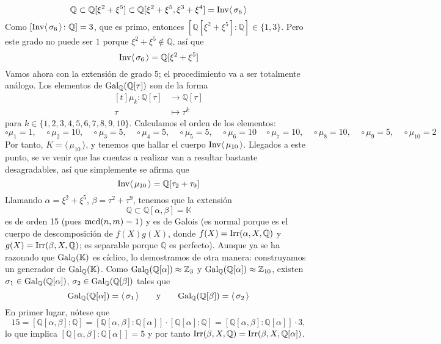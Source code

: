 \documentclass[11pt]{report}
\makeatletter
\renewenvironment{proof}[1][\proofname]{\par
  \pushQED{\qed}%
  \normalfont \topsep\z@skip %
  \trivlist
  \item[\hskip\labelsep
        \itshape
    #1\@addpunct{.}]\ignorespaces
}{%
  \popQED\endtrivlist\@endpefalse
}
\newcommand{\Z}{\mathbb Z}
\newcommand{\Q}{\mathbb Q}
\newcommand{\K}{\mathbb K}
\makeatother
\begin{document}
\begin{proof}
\[\Q \subset \Q[\xi^2+\xi^5] \subset \Q[\xi^2+\xi^5,\xi^3+\xi^4] = \textup{Inv}\langle \, \sigma_6 \, \rangle\]
Como $[ \textup{Inv}\langle \, \sigma_6 \, \rangle \colon \Q] = 3$, que es primo, entonces $[\Q[\xi^2+\xi^5] \colon \Q] \in \{1,3\}$. Pero este grado no puede ser $1$ porque $\xi^2 +\xi^5 \not\in \Q$, así que
\[\textup{Inv}\langle \, \sigma_6 \, \rangle = \Q[\xi^2+\xi^5]\]
Vamos ahora con la extensión de grado 5; el procedimiento va a ser totalmente análogo. Los elementos de $\textup{Gal}_\Q(\Q[\tau])$ son de la forma
\[\begin{aligned}[t]
    \mu_k \colon \Q[\tau] &\longrightarrow \Q[\tau] \\
    \tau &\longmapsto \tau^k
\end{aligned}\]
para $k \in \{1,2,3,4,5,6,7,8,9,10\}$. Calculamos el orden de los elementos:
\[\circ \mu_1 = 1, \quad \circ \mu_2 = 10, \quad \circ \mu_3 = 5, \quad \circ \mu_4 = 5, \quad \circ \mu_5 = 5, \quad \circ \mu_6 = 10 \quad \circ \mu_7 =  10,\quad \circ \mu_8 =  10,\quad \circ \mu_9 = 5, \quad \circ \mu_{10} = 2\]
Por tanto, $K = \langle \, \mu_{10}\, \rangle$, y tenemos que hallar el cuerpo $\textup{Inv}\langle \, \mu_{10} \, \rangle$. Llegados a este punto, se ve venir que las cuentas a realizar van a resultar bastante desagradables, así que simplemente se afirma que
\[\textup{Inv}\langle \, \mu_{10} \, \rangle = \Q[\tau_2+\tau_9]\]
Llamando $\alpha = \xi^2+\xi^5$, $\beta = \tau^2+\tau^9$, tenemos que la extensión \[\Q \subset \Q[\alpha,\beta]= \K\] es de orden 15 (pues $\textup{mcd}(n,m)=1$) y es de Galois (es normal porque es el cuerpo de descomposición de $f(X)g(X)$, donde $f(X)=\textup{Irr}(\alpha,X,\Q)$ y $g(X)=\textup{Irr}(\beta,X,\Q)$; es separable porque $\Q$ es perfecto). Aunque ya se ha razonado que $\textup{Gal}_\Q(\K)$ es cíclico, lo demostramos de otra manera: construyamos un generador de $\textup{Gal}_\Q(\K)$. Como $\textup{Gal}_\Q(\Q[\alpha]) \approx \Z_3$ y $\textup{Gal}_\Q(\Q[\alpha]) \approx \Z_{10}$, existen $\sigma_1 \in \textup{Gal}_\Q(\Q[\alpha])$, $\sigma_2 \in \textup{Gal}_\Q(\Q[\beta])$ tales que
\[ \textup{Gal}_\Q(\Q[\alpha])=\langle \, \sigma_1 \, \rangle \qquad \textup{y} \qquad  \textup{Gal}_\Q(\Q[\beta]) = \langle \, \sigma_2 \, \rangle\]
En primer lugar, nótese que
\[15 = [\Q[\alpha,\beta] \colon \Q] = [\Q[\alpha,\beta]\colon \Q[\alpha]] \cdot [\Q[\alpha] \colon \Q] = [\Q[\alpha,\beta]\colon \Q[\alpha]] \cdot 3,\]
lo que implica $ [\Q[\alpha,\beta]\colon \Q[\alpha]] = 5$ y por tanto $\textup{Irr}(\beta,X,\Q) = \textup{Irr}(\beta,X,\Q[\alpha])$.


\end{proof}
\end{document}
